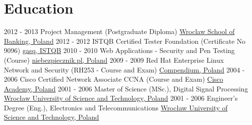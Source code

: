 \documentclass[letterpaper]{tenseconds} %
\begin{document}
\section{Education}
\begin{twenty} %
    \twentyitem
        {2012 - 2013}
        {}
        {Project Management \textnormal{(Postgraduate Diploma)}}
        {\href{https://www.wsb.pl/}{Wroclaw School of Banking, Poland}}
        {}
        {}
    \twentyitem
        {2012 - 2012}
        {}
        {ISTQB Certified Tester Foundation \textnormal{(Certificate No 9096)}}
        {\href{https://www.istqb.org/}{gasq, ISTQB}}
        {}
        {}
    \twentyitem
        {2010 - 2010}
        {}
        {Web Applications - Security and Pen Testing \textnormal{(Course)}}
        {\href{https://www.niebezpiecznik.pl/}{niebezpiecznik.pl, Poland}}
        {}
        {}
    \twentyitem
        {2009 - 2009}
        {}
        {Red Hat Enterprise Linux Network and Security \textnormal{(RH253 - Course and Exam)}}
        {\href{https://www.compendium.pl/}{Compendium, Poland}}
        {}
        {}
    \twentyitem
        {2004 - 2006}
        {}
        {Cisco Certified Network Associate CCNA \textnormal{(Course and Exam)}}
        {\href{https://www.cisco.com/}{Cisco Academy, Poland}}
        {}
        {}
    \twentyitem
        {2001 - 2006}
        {}
        {Master of Science (MSc.), Digital Signal Processing}
        {\href{https://pwr.edu.pl/}{Wrocław University of Science and Technology, Poland}}
        {}
        {}
    \twentyitem
        {2001 - 2006}
        {}
        {Engineer's Degree (Eng.), Electronics and Telecommunications}
        {\href{https://pwr.edu.pl/}{Wrocław University of Science and Technology, Poland}}
        {}
        {}
\end{twenty}
\end{document}
